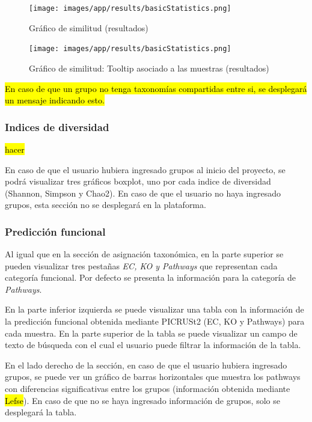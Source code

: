 \begin{itemize}
\begin{figure}[H]
    \texttt{[image: images/app/results/basicStatistics.png]}

    \caption{Gráfico de similitud  (resultados)}
    \label{fig:app-results-core}
\end{figure}

\begin{figure}[H]
    \texttt{[image: images/app/results/basicStatistics.png]}

    \caption{Gráfico de similitud: Tooltip asociado a las muestras (resultados)}
    \label{fig:app-results-core-tooltip}
\end{figure}

\hl{En caso de que un grupo no tenga taxonomías compartidas entre si, se desplegará un mensaje indicando esto.}
\subsubsection{Indices de diversidad}
\hl{hacer}

En caso de que el usuario hubiera ingresado grupos al inicio del proyecto, se podrá visualizar tres gráficos boxplot, uno por cada indice de diversidad (Shannon, Simpson y Chao2). En caso de que el usuario no haya ingresado grupos, esta sección no se desplegará en la plataforma.


\subsubsection{Predicción funcional}
Al igual que en la sección de asignación taxonómica, en la parte superior se pueden visualizar tres pestañas \textit{EC, KO y Pathways} que representan cada categoría funcional. Por defecto se presenta la información para la categoría de \textit{Pathways}.

En la parte inferior izquierda se puede visualizar una tabla con la información de la predicción funcional obtenida mediante PICRUSt2 (EC, KO y Pathways) para cada muestra. 
En la parte superior de la tabla se puede visualizar un campo de texto de búsqueda con el cual el usuario puede filtrar la información de la tabla.

En el lado derecho de la sección, en caso de que el usuario hubiera ingresado grupos, se puede ver un gráfico de barras horizontales que muestra los pathways con diferencias significativas entre los grupos (información obtenida mediante \hl{Lefse}). 
En caso de que no se haya ingresado información de grupos, solo se desplegará la tabla.


\end{itemize}
